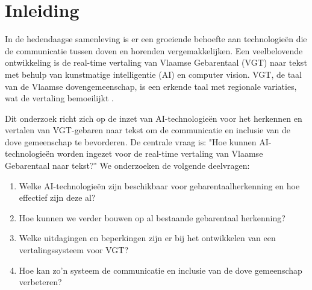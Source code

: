 


% 
\newcommand{\figref}[1]{(Zie \hyperref[#1]{figuur: \ref{#1}})}

\section{Inleiding}%
\label{sec:inleiding}

In de hedendaagse samenleving is er een groeiende behoefte aan technologieën die de communicatie tussen doven en horenden vergemakkelijken. Een veelbelovende ontwikkeling is de real-time vertaling van Vlaamse Gebarentaal (VGT) naar tekst met behulp van kunstmatige intelligentie (AI) en computer vision. VGT, de taal van de Vlaamse dovengemeenschap, is een erkende taal met regionale variaties, wat de vertaling bemoeilijkt \autocite{vanmeerbergen2000simultane}.

Dit onderzoek richt zich op de inzet van AI-technologieën voor het herkennen en vertalen van VGT-gebaren naar tekst om de communicatie en inclusie van de dove gemeenschap te bevorderen. De centrale vraag is: "Hoe kunnen AI-technologieën worden ingezet voor de real-time vertaling van Vlaamse Gebarentaal naar tekst?" We onderzoeken de volgende deelvragen:

\begin{enumerate} 
  \item Welke AI-technologieën zijn beschikbaar voor gebarentaalherkenning en hoe effectief zijn deze al? 
  \item Hoe kunnen we verder bouwen op al bestaande gebarentaal herkenning? 
  \item Welke uitdagingen en beperkingen zijn er bij het ontwikkelen van een vertalingssysteem voor VGT? 
  \item Hoe kan zo'n systeem de communicatie en inclusie van de dove gemeenschap verbeteren?
\end{enumerate}


